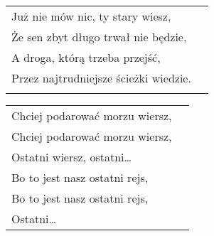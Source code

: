 \documentclass[a5paper]{article}
\begin{document}
\noindent
\begin{tabular}{@{}p{8.00cm}p{3cm}@{}}
Już nie mów nic, ty stary wiesz, \\
Że sen zbyt długo trwał nie będzie,	\\
A droga, którą trzeba przejść, \\
Przez najtrudniejsze ścieżki wiedzie.\\ \\
\end{tabular}

\noindent
\begin{tabular}{@{}p{8.00cm}p{3cm}@{}}
Chciej podarować morzu wiersz, \\
Chciej podarować morzu wiersz, \\
Ostatni wiersz, ostatni… \\
Bo to jest nasz ostatni rejs, \\
Bo to jest nasz ostatni rejs, \\
Ostatni…
\end{tabular}
\end{document}
